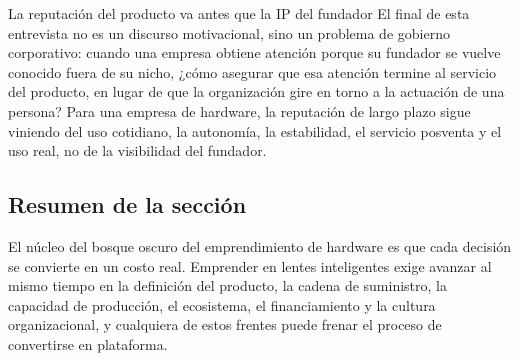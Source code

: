 \begin{importantbox}{La reputación del producto va antes que la IP del fundador}
El final de esta entrevista no es un discurso motivacional, sino un problema de gobierno corporativo: cuando una empresa obtiene atención porque su fundador se vuelve conocido fuera de su nicho, ¿cómo asegurar que esa atención termine al servicio del producto, en lugar de que la organización gire en torno a la actuación de una persona? Para una empresa de hardware, la reputación de largo plazo sigue viniendo del uso cotidiano, la autonomía, la estabilidad, el servicio posventa y el uso real, no de la visibilidad del fundador.
\end{importantbox}

\subsection{Resumen de la sección}

El núcleo del bosque oscuro del emprendimiento de hardware es que cada decisión se convierte en un costo real. Emprender en lentes inteligentes exige avanzar al mismo tiempo en la definición del producto, la cadena de suministro, la capacidad de producción, el ecosistema, el financiamiento y la cultura organizacional, y cualquiera de estos frentes puede frenar el proceso de convertirse en plataforma.
